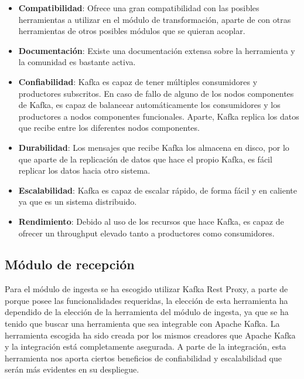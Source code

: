 \begin{itemize}
	\item \textbf{Compatibilidad}: Ofrece una gran compatibilidad con las posibles herramientas a utilizar en el módulo de transformación, aparte de con otras herramientas de otros posibles módulos que se quieran acoplar.
	
	\item \textbf{Documentación}: Existe una documentación extensa sobre la herramienta y la comunidad es bastante activa.
	
	\item \textbf{Confiabilidad}: Kafka es capaz de tener múltiples consumidores y productores subscritos. En caso de fallo de alguno de los nodos componentes de Kafka, es capaz de balancear automáticamente los consumidores y los productores a nodos componentes funcionales. Aparte, Kafka replica los datos que recibe entre los diferentes nodos componentes.
	
	\item \textbf{Durabilidad}: Los mensajes que recibe Kafka los almacena en disco, por lo que aparte de la replicación de datos que hace el propio Kafka, es fácil replicar los datos hacia otro sistema.
	
	\item \textbf{Escalabilidad}: Kafka es capaz de escalar rápido, de forma fácil y en caliente ya que es un sistema distribuido.
	
	\item \textbf{Rendimiento}: Debido al uso de los recursos que hace Kafka, es capaz de ofrecer un throughput elevado tanto a productores como consumidores.
\end{itemize}

\subsection{Módulo de recepción}
Para el módulo de ingesta se ha escogido utilizar Kafka Rest Proxy\cite{Tfg:kafkarestproxy}, a parte de porque posee las funcionalidades requeridas, la elección de esta herramienta ha dependido de la elección de la herramienta del módulo de ingesta, ya que se ha tenido que buscar una herramienta que sea integrable con Apache Kafka. La herramienta escogida ha sido creada por los mismos creadores que Apache Kafka y la integración está completamente asegurada. A parte de la integración, esta herramienta nos aporta ciertos beneficios de confiabilidad y escalabilidad que serán más evidentes en su despliegue.

